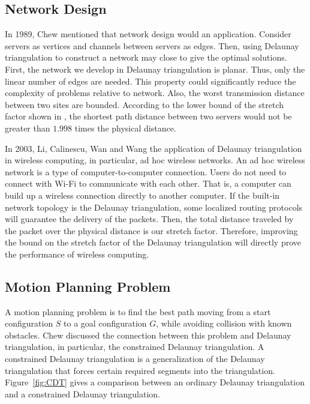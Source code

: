 \subsection{Network Design}
In 1989, Chew\cite{chew} mentioned that network design would an application.  Consider servers as vertices and channels between servers as edges. Then, using Delaunay triangulation to construct a network may close to give the optimal solutions. First, the network we develop in Delaunay triangulation is planar. Thus, only the linear number of edges are needed. This property could significantly reduce the complexity of problems relative to network. Also, the worst transmission distance between two sites are bounded. According to  the lower bound of the stretch factor shown in \cite{xia}, the shortest path distance between two servers would not be greater than $1.998$ times the physical distance.

In 2003, Li, Calinescu, Wan and Wang\cite{ad} the application of Delaunay triangulation in wireless computing, in particular, ad hoc wireless networks. An ad hoc  wireless network is a type of computer-to-computer connection. Users do not need to connect with Wi-Fi to communicate with each other. That is, a computer can build up a wireless connection directly to another computer. If the built-in network topology is the Delaunay triangulation, some localized routing protocols will guarantee the delivery of the packets. Then, the total distance traveled by the packet over the physical distance is our stretch factor. Therefore, improving the bound on the stretch factor of the Delaunay triangulation will directly prove the performance of wireless computing. 





\subsection{Motion Planning Problem}
A motion planning problem is to find the best path moving from a start configuration  $S$ to a goal configuration $G$, while avoiding collision with known obstacles. Chew \cite{chew} discussed the connection between this problem and Delaunay triangulation, in particular,  the constrained Delaunay triangulation. A constrained Delaunay triangulation is a generalization of the Delaunay triangulation that forces certain required segments into the triangulation. Figure~\ref{fig:CDT} gives a comparison between an ordinary Delaunay triangulation and a constrained Delaunay triangulation. 



